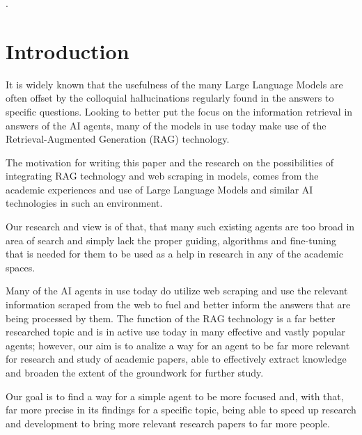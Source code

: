 \documentclass[fleqn,moreauthors,10pt]{ds_report}
\affiliation{\textit{Advisors: Aleš Žagar}}
\begin{document}
\flushbottom 

\maketitle 
.
\thispagestyle{empty} 


\section*{Introduction}

It is widely known that the usefulness of the many Large Language Models are often offset by the colloquial hallucinations regularly found in the answers to specific questions. Looking to better put the focus on the information retrieval in answers of the AI agents, many of the models in use today make use of the Retrieval-Augmented Generation (RAG) technology.

The motivation for writing this paper and the research on the possibilities of integrating RAG technology and web scraping in models, comes from the academic experiences and use of Large Language Models and similar AI technologies in such an environment. 

Our research and view is of that, that many such existing agents are too broad in area of search and simply lack the proper guiding, algorithms and fine-tuning that is needed for them to be used as a help in research in any of the academic spaces. 

Many of the AI agents in use today do utilize web scraping and use the relevant information scraped from the web to fuel and better inform the answers that are being processed by them. The function of the RAG technology is a far better researched topic and is in active use today in many effective and vastly popular agents; however, our aim is to analize a way for an agent to be far more relevant for research and study of academic papers, able to effectively extract knowledge and broaden the extent of the groundwork for further study.

Our goal is to find a way for a simple agent to be more focused and, with that, far more precise in its findings for a specific topic, being able to speed up research and development to bring more relevant research papers to far more people.
\end{document}
